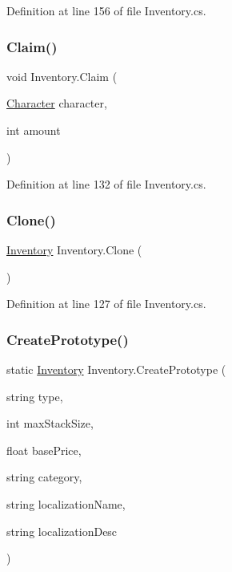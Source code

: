Definition at line 156 of file Inventory.\+cs.

\mbox{\label{class_inventory_a19ba4679b788734eeb5f5d752d0b55a0}} 
\subsubsection{\texorpdfstring{Claim()}{Claim()}}
{\footnotesize\ttfamily void Inventory.\+Claim (\begin{DoxyParamCaption}\item[{\hyperlink{class_project_porcupine_1_1_entities_1_1_character}{Character}}]{character,  }\item[{int}]{amount }\end{DoxyParamCaption})}



Definition at line 132 of file Inventory.\+cs.

\mbox{\label{class_inventory_a1f887c1fe8e885cdf64db0a4f57086c1}} 
\subsubsection{\texorpdfstring{Clone()}{Clone()}}
{\footnotesize\ttfamily \hyperlink{class_inventory}{Inventory} Inventory.\+Clone (\begin{DoxyParamCaption}{ }\end{DoxyParamCaption})}



Definition at line 127 of file Inventory.\+cs.

\mbox{\label{class_inventory_a79ca58bbf438e53b0a83f7d10dd9e468}} 
\subsubsection{\texorpdfstring{Create\+Prototype()}{CreatePrototype()}}
{\footnotesize\ttfamily static \hyperlink{class_inventory}{Inventory} Inventory.\+Create\+Prototype (\begin{DoxyParamCaption}\item[{string}]{type,  }\item[{int}]{max\+Stack\+Size,  }\item[{float}]{base\+Price,  }\item[{string}]{category,  }\item[{string}]{localization\+Name,  }\item[{string}]{localization\+Desc }\end{DoxyParamCaption})\hspace{0.3cm}{\ttfamily [static]}}



